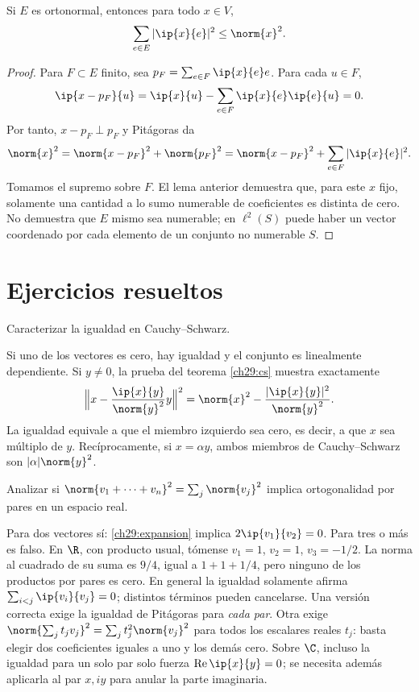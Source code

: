 \begin{teorema}[Bessel]\label{ch29:bessel}
Si $E$ es ortonormal, entonces para todo $x\in V$,
\[
 \sum_{e\in E}|\ip{x}{e}|^{2}\leq\norm{x}^{2}.
\]
\end{teorema}
\begin{proof}
Para $F\subset E$ finito, sea $p_F=\sum_{e\in F}\ip{x}{e}e$. Para cada $u\in F$,
\[
 \ip{x-p_F}{u}=\ip{x}{u}-\sum_{e\in F}\ip{x}{e}\ip{e}{u}=0.
\]
Por tanto, $x-p_F\perp p_F$ y Pitágoras da
\[
 \norm{x}^{2}=\norm{x-p_F}^{2}+\norm{p_F}^{2}
 =\norm{x-p_F}^{2}+\sum_{e\in F}|\ip{x}{e}|^{2}.
\]
Tomamos el supremo sobre $F$. El lema anterior demuestra que, para este $x$ fijo, solamente una cantidad a lo sumo numerable de coeficientes es distinta de cero. No demuestra que $E$ mismo sea numerable; en $\ell^{2}(S)$ puede haber un vector coordenado por cada elemento de un conjunto no numerable $S$.
\end{proof}

\section{Ejercicios resueltos}

\begin{ejercicio}
Caracterizar la igualdad en Cauchy--Schwarz.
\end{ejercicio}
\begin{solucion}
Si uno de los vectores es cero, hay igualdad y el conjunto es linealmente dependiente. Si $y\ne0$, la prueba del teorema \ref{ch29:cs} muestra exactamente
\[
 \Big\|x-\frac{\ip{x}{y}}{\norm{y}^{2}}y\Big\|^{2}
 =\norm{x}^{2}-\frac{|\ip{x}{y}|^{2}}{\norm{y}^{2}}.
\]
La igualdad equivale a que el miembro izquierdo sea cero, es decir, a que $x$ sea múltiplo de $y$. Recíprocamente, si $x=\alpha y$, ambos miembros de Cauchy--Schwarz son $|\alpha|\norm{y}^{2}$.
\end{solucion}

\begin{ejercicio}
Analizar si $\norm{v_1+\cdots+v_n}^{2}=\sum_j\norm{v_j}^{2}$ implica ortogonalidad por pares en un espacio real.
\end{ejercicio}
\begin{solucion}
Para dos vectores sí: \eqref{ch29:expansion} implica $2\ip{v_1}{v_2}=0$. Para tres o más es falso. En $\R$, con producto usual, tómense $v_1=1$, $v_2=1$, $v_3=-1/2$. La norma al cuadrado de su suma es $9/4$, igual a $1+1+1/4$, pero ninguno de los productos por pares es cero. En general la igualdad solamente afirma $\sum_{i<j}\ip{v_i}{v_j}=0$; distintos términos pueden cancelarse. Una versión correcta exige la igualdad de Pitágoras para \emph{cada par}. Otra exige $\norm{\sum_j t_jv_j}^{2}=\sum_j t_j^{2}\norm{v_j}^{2}$ para todos los escalares reales $t_j$: basta elegir dos coeficientes iguales a uno y los demás cero. Sobre $\C$, incluso la igualdad para un solo par solo fuerza $\operatorname{Re}\ip{x}{y}=0$; se necesita además aplicarla al par $x,iy$ para anular la parte imaginaria.
\end{solucion}

